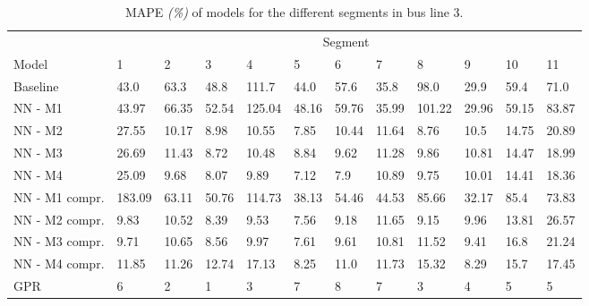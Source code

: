 \begin{table}[H]
  \centering
  \caption{MAPE \textit{(\%)} of models for the different segments in bus line 3.}
  \label{fig:model-mape-of-segs-203}
  \begin{adjustbox}{center}
\begin{tabular}{ l | l | l | l | l | l | l | l | l | l | l | l }
	& \multicolumn{11}{c}{Segment} \\
	Model       & 1 & 2 & 3 & 4 & 5 & 6 & 7 & 8 & 9 & 10 & 11 \\
	\hline
	Baseline  & 43.0 & 63.3 & 48.8 & 111.7 & 44.0 & 57.6 & 35.8 & 98.0 & 29.9 & 59.4  & 71.0 \\
	NN - M1         & 43.97& 66.35& 52.54& 125.04& 48.16& 59.76& 35.99& 101.22& 29.96& 59.15& 83.87 \\
    	NN - M2         & 27.55& 10.17& 8.98& 10.55& 7.85& 10.44& 11.64& 8.76& 10.5& 14.75& 20.89\\
    	NN - M3        & 26.69& 11.43& 8.72& 10.48& 8.84& 9.62& 11.28& 9.86& 10.81& 14.47& 18.99\\
    	NN - M4        & 25.09& 9.68& 8.07& 9.89& 7.12& 7.9& 10.89& 9.75& 10.01& 14.41& 18.36\\
    	NN - M1 compr.         & 183.09& 63.11& 50.76& 114.73& 38.13& 54.46& 44.53& 85.66& 32.17& 85.4& 73.83 \\ 
    	NN - M2 compr.         & 9.83& 10.52& 8.39& 9.53& 7.56& 9.18& 11.65& 9.15& 9.96& 13.81& 26.57 \\
    	NN - M3 compr.         & 9.71& 10.65& 8.56& 9.97& 7.61& 9.61& 10.81& 11.52& 9.41& 16.8& 21.24 \\
    	NN - M4 compr.         & 11.85& 11.26& 12.74& 17.13& 8.25& 11.0& 11.73& 15.32& 8.29& 15.7& 17.45 \\
	GPR         & 6 & 2 & 1 & 3 &  7 & 8 &  7 & 3 & 4 & 5  & 5 \\
\end{tabular}
\end{adjustbox}
\end{table}

